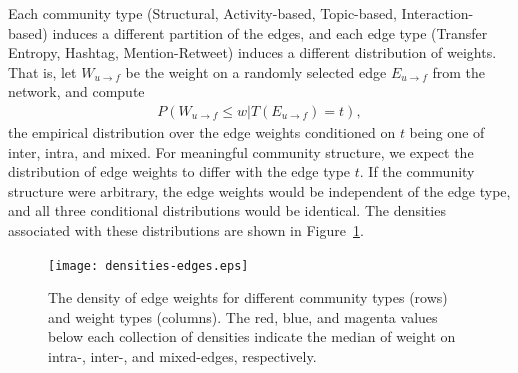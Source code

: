 
Each community type (Structural, Activity-based, Topic-based, Interaction-based) induces a different partition of the edges, and each edge type (Transfer Entropy, Hashtag, Mention-Retweet) induces a different distribution of weights. That is, let $W_{u \to f}$ be the weight on a randomly selected edge $E_{u \to f}$ from the network, and compute
\begin{align}
	P(W_{u \to f} \leq w | T(E_{u \to f}) = t),
\end{align}
the empirical distribution over the edge weights conditioned on $t$ being one of inter, intra, and mixed. For meaningful community structure, we expect the distribution of edge weights to differ with the edge type $t$. If the community structure were arbitrary, the edge weights would be independent of the edge type, and all three conditional distributions would be identical.
The densities associated with these distributions are shown in Figure~\ref{Fig-distributions_by_types}.
\begin{figure}[!h]
	\centering
	\texttt{[image: densities-edges.eps]}
	\caption{The density of edge weights for different community types (rows) and weight types (columns). The red,  blue, and magenta values below each collection of densities indicate the median of weight on intra-, inter-, and mixed-edges, respectively.}
	\label{Fig-distributions_by_types}
\end{figure}

